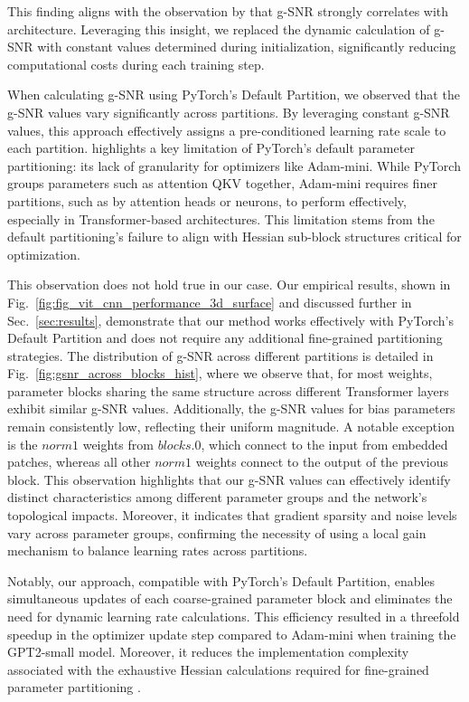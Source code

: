 This finding aligns with the observation by \cite{xiang2023exploiting} that g-SNR strongly correlates with architecture. Leveraging this insight, we replaced the dynamic calculation of g-SNR with constant values determined during initialization, significantly reducing computational costs during each training step.

When calculating g-SNR using PyTorch's Default Partition, we observed that the g-SNR values vary significantly across partitions. By leveraging constant g-SNR values, this approach effectively assigns a pre-conditioned learning rate scale to each partition. \cite{zhang2024adamminiusefewerlearning} highlights a key limitation of PyTorch's default parameter partitioning: its lack of granularity for optimizers like Adam-mini. While PyTorch groups parameters such as attention QKV together, Adam-mini requires finer partitions, such as by attention heads or neurons, to perform effectively, especially in Transformer-based architectures. This limitation stems from the default partitioning's failure to align with Hessian sub-block structures critical for optimization.

This observation does not hold true in our case. Our empirical results, shown in Fig.~\ref{fig:fig_vit_cnn_performance_3d_surface} and discussed further in Sec.~\ref{sec:results}, demonstrate that our method works effectively with PyTorch's Default Partition and does not require any additional fine-grained partitioning strategies. The distribution of g-SNR across different partitions is detailed in Fig.~\ref{fig:gsnr_across_blocks_hist}, where we observe that, for most weights, parameter blocks sharing the same structure across different Transformer layers exhibit similar g-SNR values. Additionally, the g-SNR values for bias parameters remain consistently low, reflecting their uniform magnitude. A notable exception is the $norm1$ weights from $blocks.0$, which connect to the input from embedded patches, whereas all other $norm1$ weights connect to the output of the previous block. This observation highlights that our g-SNR values can effectively identify distinct characteristics among different parameter groups and the network's topological impacts. Moreover, it indicates that gradient sparsity and noise levels vary across parameter groups, confirming the necessity of using a local gain mechanism to balance learning rates across partitions.

Notably, our approach, compatible with PyTorch's Default Partition, enables simultaneous updates of each coarse-grained parameter block and eliminates the need for dynamic learning rate calculations. This efficiency resulted in a threefold speedup in the optimizer update step compared to Adam-mini when training the GPT2-small model. Moreover, it reduces the implementation complexity associated with the exhaustive Hessian calculations required for fine-grained parameter partitioning \cite{zhang2024adamminiusefewerlearning}.

